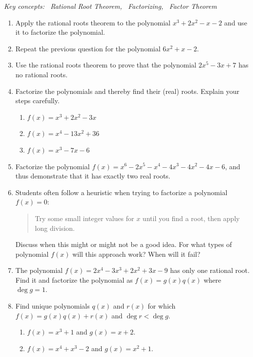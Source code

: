 \begin{exercises}{}{}
	\hangindent\leftmargini
	\emph{Key concepts: \ Rational Root Theorem, \ Factorizing, \ Factor Theorem}
	
	\begin{enumerate}
	  \item Apply the rational roots theorem to the polynomial $x^3+2x^2-x-2$ and use it to factorize the polynomial.
	  
	  \item Repeat the previous question for the polynomial $6x^2+x-2$.
	
		\item Use the rational roots theorem to prove that the polynomial $2x^5-3x+7$ has no rational roots.
	  
	  \item Factorize the polynomials and thereby find their (real) roots. Explain your steps carefully.
	  \begin{enumerate}
	    \item $f(x)=x^3+2x^2-3x$ %
	    \item $f(x)=x^4-13x^2+36$ %
	    \item $f(x)=x^3-7x-6$ %
	  \end{enumerate}
	  
	  
	  \item Factorize the polynomial $f(x)=x^6-2x^5-x^4-4x^3-4x^2-4x-6$, %
	  and thus demonstrate that it has exactly two real roots.
	  
	  
	  \item Students often follow a heuristic when trying to factorize a polynomial $f(x)=0$:
	  \begin{quote}
	  	Try some small integer values for $x$ until you find a root, then apply long division.
	  \end{quote}
	  Discuss when this might or might not be a good idea. For what types of polynomial $f(x)$ will this approach work? When will it fail?
	  
		
		\item The polynomial $f(x)=2x^4-3x^3+2x^2+3x-9$ has only one rational root. Find it and factorize the polynomial as $f(x)=g(x)q(x)$ where $\deg g=1$.
		
		
		\item Find unique polynomials $q(x)$ and $r(x)$ for which $f(x)=g(x)q(x)+r(x)$ and $\deg r<\deg g$.
		\begin{enumerate}
		  \item $f(x)=x^3+1$ and $g(x)=x+2$.
		  \item	$f(x)=x^4+x^3-2$ and $g(x)=x^2+1$.
		\end{enumerate}  
	

\end{enumerate}
\end{exercises}
